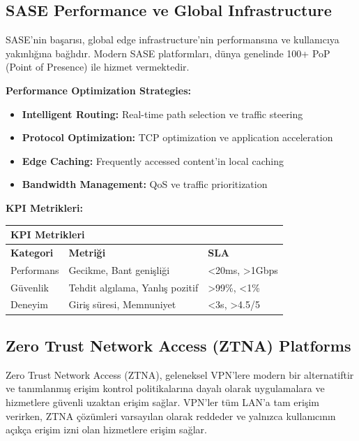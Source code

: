 \subsection{SASE Performance ve Global Infrastructure}

SASE'nin başarısı, global edge infrastructure'nin performansına ve kullanıcıya yakınlığına bağlıdır. Modern SASE platformları, dünya genelinde 100+ PoP (Point of Presence) ile hizmet vermektedir.

\textbf{Performance Optimization Strategies:}
\begin{itemize}
    \item \textbf{Intelligent Routing:} Real-time path selection ve traffic steering
    \item \textbf{Protocol Optimization:} TCP optimization ve application acceleration
    \item \textbf{Edge Caching:} Frequently accessed content'in local caching
    \item \textbf{Bandwidth Management:} QoS ve traffic prioritization
\end{itemize}

\noindent\textbf{KPI Metrikleri:}

\begin{tabular}{|p{4cm}|p{6cm}|p{4cm}|}
\hline
\hline
\multicolumn{3}{|C{2cm}|}{\textbf{KPI Metrikleri}} \\
\hline
\textbf{Kategori} & \textbf{Metriği} & \textbf{SLA}  \\
\hline
\hline
Performans & Gecikme, Bant genişliği & <20ms, >1Gbps  \\
\hline
\hline
Güvenlik & Tehdit algılama, Yanlış pozitif & >99\%, <1\%  \\
\hline
\hline
Deneyim & Giriş süresi, Memnuniyet & <3s, >4.5/5  \\
\hline
\hline
\hline
\end{tabular}


\subsection{Zero Trust Network Access (ZTNA) Platforms}

Zero Trust Network Access (ZTNA), geleneksel VPN'lere modern bir alternatiftir ve tanımlanmış erişim kontrol politikalarına dayalı olarak uygulamalara ve hizmetlere güvenli uzaktan erişim sağlar. VPN'ler tüm LAN'a tam erişim verirken, ZTNA çözümleri varsayılan olarak reddeder ve yalnızca kullanıcının açıkça erişim izni olan hizmetlere erişim sağlar.

